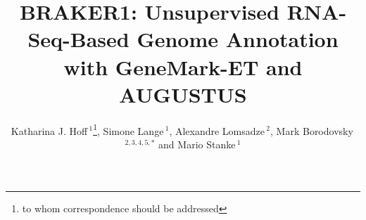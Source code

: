 \documentclass{bioinfo}
\begin{document}

\title[BRAKER1]{BRAKER1: Unsupervised RNA-Seq-Based Genome Annotation with GeneMark-ET and AUGUSTUS}
\author[Hoff \textit{et~al}]{Katharina J. Hoff\,$^{1}$\footnote{to whom correspondence should be addressed}, Simone Lange\,$^{1}$, Alexandre Lomsadze\,$^{2}$, Mark Borodovsky\,$^{2,3,4,5,*}$ and Mario Stanke\,$^1$}
\address{$^{1}$Ernst Moritz Arndt Universit\"{a}t Greifswald, Institute for Mathematics and Computer Science, Walther-Rathenau-Stra\ss{}e 47, 17487 Greifswald, Germany\\
$^{2}$School of Computational Science and Engineering\\
$^{3}$Center for Bioinformatics and Computational Genomics, Georgia Institute of Technology, Atlanta, GA 30332, USA\\
$^{4}$Department of Biological and Medical Physics, Moscow Institute of Physics and Technology, Dolgoprudny, Moscow Region, Russia\\
$^{5}$Joint Georgia Tech and Emory University Wallace H Coulter Department of Biomedical Engineering, Atlanta, GA 30332, USA}



\maketitle
\end{document}
